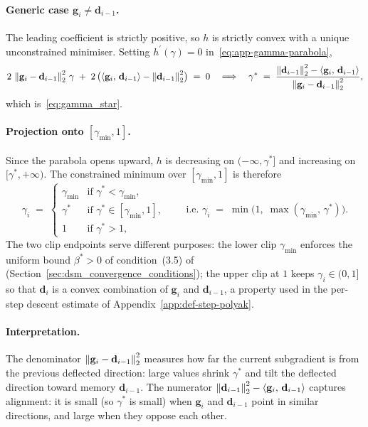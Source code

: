 \paragraph{Generic case $\mathbf{g}_i \neq \mathbf{d}_{i-1}$.}
The leading coefficient is strictly positive, so $h$ is strictly convex with a unique unconstrained minimiser. Setting $h^{\prime}(\gamma) = 0$ in~\eqref{eq:app-gamma-parabola},
\[
2\,\left\lVert \mathbf{g}_i - \mathbf{d}_{i-1} \right\rVert_2^{2}\,\gamma \;+\; 2\,\bigl(\left\langle \mathbf{g}_i,\, \mathbf{d}_{i-1} \right\rangle - \left\lVert \mathbf{d}_{i-1} \right\rVert_2^{2}\bigr) \;=\; 0 \quad\Longrightarrow\quad \gamma^{*} \;=\; \frac{\left\lVert \mathbf{d}_{i-1} \right\rVert_2^{2} - \left\langle \mathbf{g}_i,\, \mathbf{d}_{i-1} \right\rangle}{\left\lVert \mathbf{g}_i - \mathbf{d}_{i-1} \right\rVert_2^{2}},
\]
which is~\eqref{eq:gamma_star}.

\paragraph{Projection onto $[\gamma_{\min}, 1]$.}
Since the parabola opens upward, $h$ is decreasing on $(-\infty, \gamma^{*}]$ and increasing on $[\gamma^{*}, +\infty)$. The constrained minimum over $[\gamma_{\min}, 1]$ is therefore
\[
\gamma_i \;=\; \begin{cases}
\gamma_{\min} & \text{if } \gamma^{*} < \gamma_{\min}, \\
\gamma^{*} & \text{if } \gamma^{*} \in [\gamma_{\min}, 1], \\
1 & \text{if } \gamma^{*} > 1,
\end{cases}
\qquad\text{i.e.\ } \gamma_i \;=\; \min\bigl(1,\; \max(\gamma_{\min},\, \gamma^{*})\bigr).
\]
The two clip endpoints serve different purposes: the lower clip $\gamma_{\min}$ enforces the uniform bound $\beta^{*} > 0$ of condition~(3.5) of~\cite{dantonio2009deflected} (Section~\ref{sec:dsm_convergence_conditions}); the upper clip at $1$ keeps $\gamma_i \in (0,1]$ so that $\mathbf{d}_i$ is a convex combination of $\mathbf{g}_i$ and $\mathbf{d}_{i-1}$, a property used in the per-step descent estimate of Appendix~\ref{app:def-step-polyak}.

\paragraph{Interpretation.}
The denominator $\left\lVert \mathbf{g}_i - \mathbf{d}_{i-1} \right\rVert_2^{2}$ measures how far the current subgradient is from the previous deflected direction: large values shrink $\gamma^{*}$ and tilt the deflected direction toward memory $\mathbf{d}_{i-1}$. The numerator $\left\lVert \mathbf{d}_{i-1} \right\rVert_2^{2} - \left\langle \mathbf{g}_i,\, \mathbf{d}_{i-1} \right\rangle$ captures alignment: it is small (so $\gamma^{*}$ is small) when $\mathbf{g}_i$ and $\mathbf{d}_{i-1}$ point in similar directions, and large when they oppose each other.

